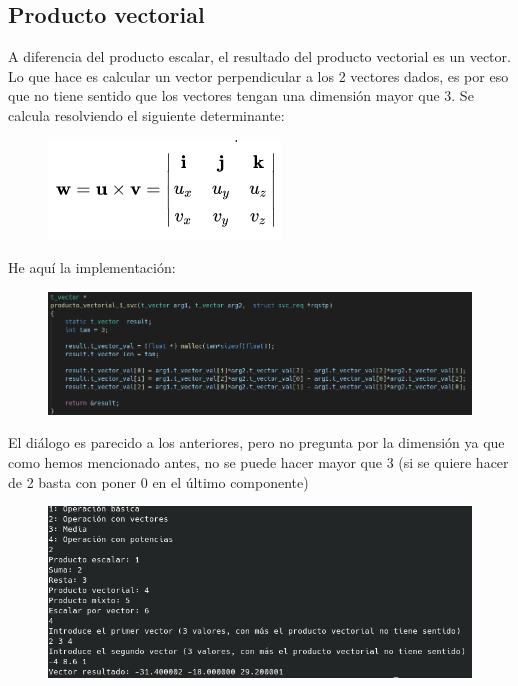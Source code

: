 \documentclass{article}
\begin{document}
	\subsection{Producto vectorial}
	A diferencia del producto escalar, el resultado del producto vectorial es un vector. Lo que hace es calcular un vector perpendicular a los 2 vectores dados, es por eso que no tiene sentido que los vectores tengan una dimensión mayor que 3. Se calcula resolviendo el siguiente determinante:
	\begin{figure}[H]
		\centering
		\includegraphics[totalheight=3cm]{img/12.png}
	\end{figure}
	He aquí la implementación:
	\begin{figure}[H]
		\centering
		\includegraphics[totalheight=3.5cm]{img/13.png}
	\end{figure}
	El diálogo es parecido a los anteriores, pero no pregunta por la dimensión ya que como hemos mencionado antes, no se puede hacer mayor que 3 (si se quiere hacer de 2 basta con poner 0 en el último componente)
	\begin{figure}[H]
		\centering
		\includegraphics[totalheight=5cm]{img/14.png}
	\end{figure}
\end{document}
